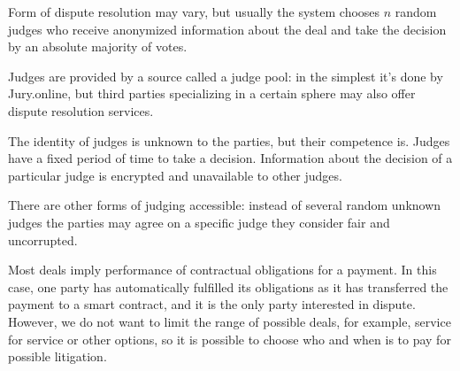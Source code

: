 \documentclass[12pt]{article}
\begin{document}
Form of dispute resolution may vary, but usually the system chooses $n$ random judges who receive anonymized information about the deal and
take the decision by an absolute majority of votes. 

Judges are provided by a source called a judge pool: in the simplest it’s done by Jury.online, but third parties specializing in a certain
sphere may also offer dispute resolution services.

The identity of judges is unknown to the parties, but their competence is. Judges have a fixed period of time to take a decision.
Information about the decision of a particular judge is encrypted and unavailable to other judges.

There are other forms of judging accessible: instead of several random unknown judges the parties may agree on a specific judge they
consider fair and uncorrupted. 


Most deals imply performance of contractual obligations for a payment. In this case, one party has automatically fulfilled its obligations
as it has transferred the payment to a smart contract, and it is the only party interested in dispute. However, we do not want to limit the
range of possible deals, for example, service for service or other options, so it is possible to choose who and when is to pay for possible
litigation.
\end{document}
